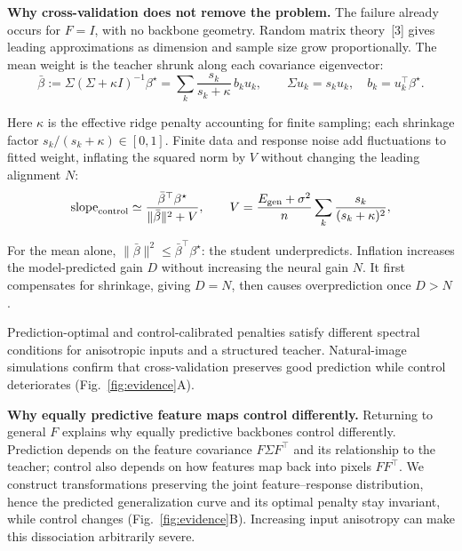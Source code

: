 \documentclass[12pt,a4paper]{article}
\newcommand{\head}[1]{\par\noindent\textbf{#1}\enspace\ignorespaces}
\newcommand{\bt}{\beta^\star}
\newcommand{\mb}{\bar\beta}
\begin{document}
\head{Why cross-validation does not remove the problem.}
The failure already occurs for $F=I$, with no backbone geometry. Random matrix theory~[3] gives leading approximations as dimension and sample size grow proportionally. The mean weight is the teacher shrunk along each covariance eigenvector:
\begin{equation}
\mb:=\Sigma(\Sigma+\kappa I)^{-1}\bt
=\sum_k\frac{s_k}{s_k+\kappa}\,b_k u_k,
\qquad \Sigma u_k=s_k u_k,\quad b_k=u_k^\top\bt.
\label{eq:mean-shrinkage}
\end{equation}
\begin{samepage}
Here $\kappa$ is the effective ridge penalty accounting for finite sampling; each shrinkage factor $s_k/(s_k+\kappa)\in[0,1]$.
Finite data and response noise add fluctuations to fitted weight, inflating the squared norm by $V$ without changing the leading alignment $N$:
\begin{equation}
\mathrm{slope}_{\rm control}\simeq
\frac{\mb^\top\bt}{\|\mb\|^2+V},
\qquad
V=\frac{E_{\rm gen}+\sigma^2}{n}
\sum_k\frac{s_k}{(s_k+\kappa)^2},
\label{eq:inflation}
\end{equation}\par
\end{samepage}
\begin{samepage}
For the mean alone, $\|\mb\|^2\le\mb^\top\bt$: the student underpredicts. Inflation increases the model-predicted gain $D$ without increasing the neural gain $N$. It first compensates for shrinkage, giving $D=N$, then causes overprediction once $D>N$.\par
\end{samepage}
\begin{samepage}
Prediction-optimal and control-calibrated penalties satisfy different spectral conditions for anisotropic inputs and a structured teacher. Natural-image simulations confirm that cross-validation preserves good prediction while control deteriorates (Fig.~\ref{fig:evidence}A).\par
\end{samepage}

\head{Why equally predictive feature maps control differently.}
Returning to general $F$ explains why equally predictive backbones control differently. Prediction depends on the feature covariance $F\Sigma F^\top$ and its relationship to the teacher; control also depends on how features map back into pixels $FF^\top$. We construct transformations preserving the joint feature--response distribution, hence the predicted generalization curve and its optimal penalty stay invariant, while control changes (Fig.~\ref{fig:evidence}B). Increasing input anisotropy can make this dissociation arbitrarily severe.
\end{document}

